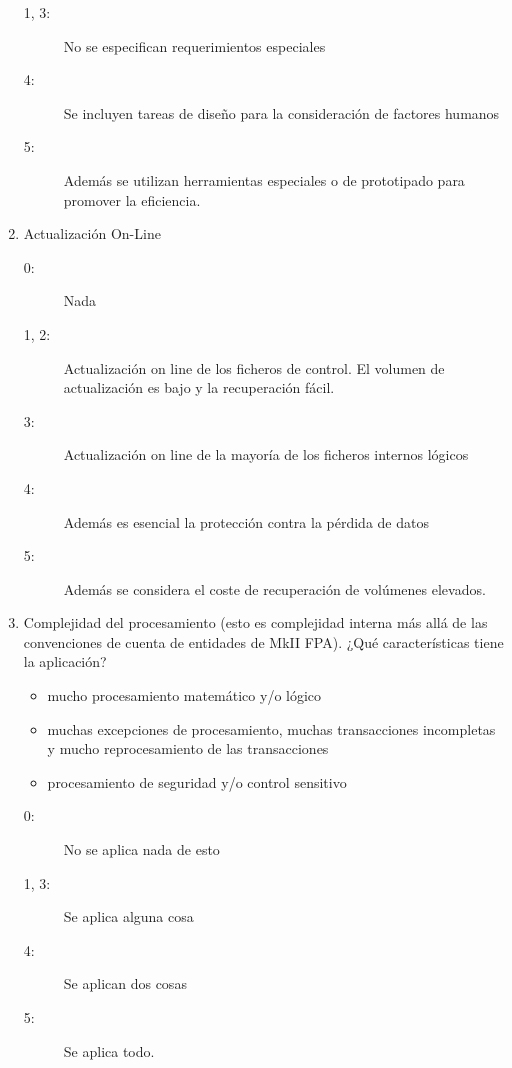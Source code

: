 \begin{enumerate}
\begin{description}
                    \item[1, 3:]No se especifican requerimientos especiales
                    \item[4:]Se incluyen tareas de diseño para la consideración de factores humanos
                    \item[5:]Además se utilizan herramientas especiales o de prototipado para promover la eficiencia.
                \end{description}
            \item Actualización On-Line
                \begin{description}
                    \item[0:]Nada
                    \item[1, 2:]Actualización on line de los ficheros de control. El volumen de actualización es bajo y la recuperación fácil.
                    \item[3:]Actualización on line de la mayoría de los ficheros internos lógicos
                    \item[4:]Además es esencial la protección contra la pérdida de datos
                    \item[5:]Además se considera el coste de recuperación de volúmenes elevados.
                \end{description}
            \item Complejidad del procesamiento (esto es complejidad interna más allá de las convenciones de cuenta de entidades de MkII FPA).
                ¿Qué características tiene la aplicación?
                \begin{itemize}
                    \item mucho procesamiento matemático y/o lógico
                    \item muchas excepciones de procesamiento, muchas transacciones incompletas y mucho reprocesamiento de las transacciones
                    \item procesamiento de seguridad y/o control sensitivo
                \end{itemize}
                \begin{description}
                    \item[0:]No se aplica nada de esto
                    \item[1, 3:]Se aplica alguna cosa
                    \item[4:]Se aplican dos cosas
                    \item[5:]Se aplica todo.

\end{description}
\end{enumerate}
